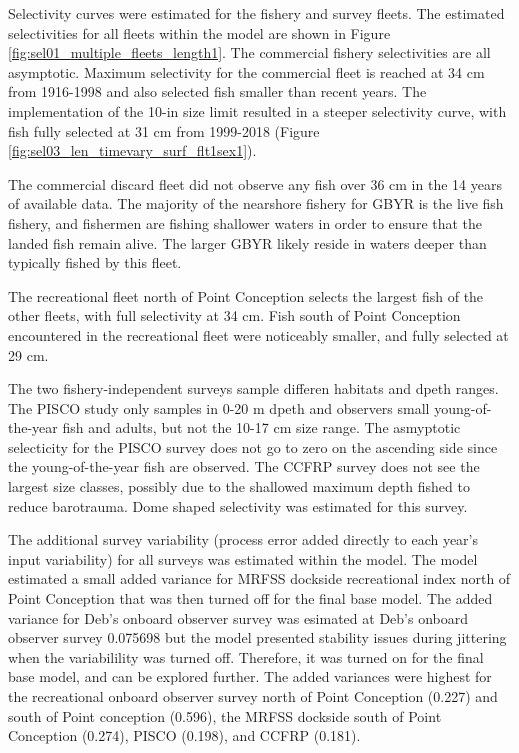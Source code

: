 \documentclass[12pt,]{article}
\begin{document}
Selectivity curves were estimated for the fishery and survey fleets. The
estimated selectivities for all fleets within the model are shown in
Figure \ref{fig:sel01_multiple_fleets_length1}. The commercial fishery
selectivities are all asymptotic. Maximum selectivity for the commercial
fleet is reached at 34 cm from 1916-1998 and also selected fish smaller
than recent years. The implementation of the 10-in size limit resulted
in a steeper selectivity curve, with fish fully selected at 31 cm from
1999-2018 (Figure \ref{fig:sel03_len_timevary_surf_flt1sex1}).

The commercial discard fleet did not observe any fish over 36 cm in the
14 years of available data. The majority of the nearshore fishery for
GBYR is the live fish fishery, and fishermen are fishing shallower
waters in order to ensure that the landed fish remain alive. The larger
GBYR likely reside in waters deeper than typically fished by this fleet.

The recreational fleet north of Point Conception selects the largest
fish of the other fleets, with full selectivity at 34 cm. Fish south of
Point Conception encountered in the recreational fleet were noticeably
smaller, and fully selected at 29 cm.

The two fishery-independent surveys sample differen habitats and dpeth
ranges. The PISCO study only samples in 0-20 m dpeth and observers small
young-of-the-year fish and adults, but not the 10-17 cm size range. The
asmyptotic selecticity for the PISCO survey does not go to zero on the
ascending side since the young-of-the-year fish are observed. The CCFRP
survey does not see the largest size classes, possibly due to the
shallowed maximum depth fished to reduce barotrauma. Dome shaped
selectivity was estimated for this survey.

The additional survey variability (process error added directly to each
year's input variability) for all surveys was estimated within the
model. The model estimated a small added variance for MRFSS dockside
recreational index north of Point Conception that was then turned off
for the final base model. The added variance for Deb's onboard observer
survey was esimated at Deb's onboard observer survey 0.075698 but the
model presented stability issues during jittering when the variabilility
was turned off. Therefore, it was turned on for the final base model,
and can be explored further. The added variances were highest for the
recreational onboard observer survey north of Point Conception (0.227)
and south of Point conception (0.596), the MRFSS dockside south of Point
Conception (0.274), PISCO (0.198), and CCFRP (0.181).
\end{document}
